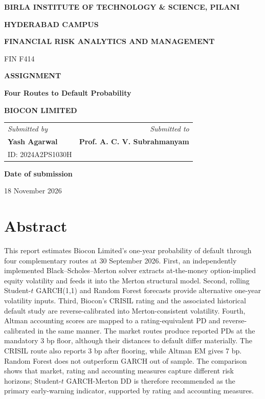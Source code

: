 \documentclass[10pt,a4paper]{article}
\begin{document}
\begin{titlepage}
\centering
\vspace*{0.7cm}
{\Large\bfseries BIRLA INSTITUTE OF TECHNOLOGY \& SCIENCE, PILANI\par}
\vspace{0.2cm}
{\large\bfseries HYDERABAD CAMPUS\par}
\vspace{1.4cm}
{\Large\bfseries FINANCIAL RISK ANALYTICS AND MANAGEMENT\par}
\vspace{0.25cm}
{\large FIN F414\par}
\vspace{1.4cm}
{\large\bfseries ASSIGNMENT\par}
\vspace{0.5cm}
{\LARGE\bfseries Four Routes to Default Probability\par}
\vspace{0.35cm}
{\Huge\bfseries BIOCON LIMITED\par}
\vspace{1.6cm}

\begin{tabularx}{0.92\textwidth}{Xr}
\textit{Submitted by} & \textit{Submitted to}\\[2pt]
\textbf{Yash Agarwal} & \textbf{Prof. A. C. V. Subrahmanyam}\\
ID: 2024A2PS1030H & \\
\end{tabularx}
\vfill
{\large\textbf{Date of submission}\par}
\vspace{0.15cm}
{\large 18 November 2026\par}
\end{titlepage}
\pagestyle{empty}

\section*{Abstract}
This report estimates Biocon Limited's one-year probability of default through four complementary routes at 30 September 2026. First, an independently implemented Black--Scholes--Merton solver extracts at-the-money option-implied equity volatility and feeds it into the Merton structural model. Second, rolling Student-$t$ GARCH(1,1) and Random Forest forecasts provide alternative one-year volatility inputs. Third, Biocon's CRISIL rating and the associated historical default study are reverse-calibrated into Merton-consistent volatility. Fourth, Altman accounting scores are mapped to a rating-equivalent PD and reverse-calibrated in the same manner. The market routes produce reported PDs at the mandatory 3 bp floor, although their distances to default differ materially. The CRISIL route also reports 3 bp after flooring, while Altman EM gives 7 bp. Random Forest does not outperform GARCH out of sample. The comparison shows that market, rating and accounting measures capture different risk horizons; Student-$t$ GARCH-Merton DD is therefore recommended as the primary early-warning indicator, supported by rating and accounting measures.
\end{document}
